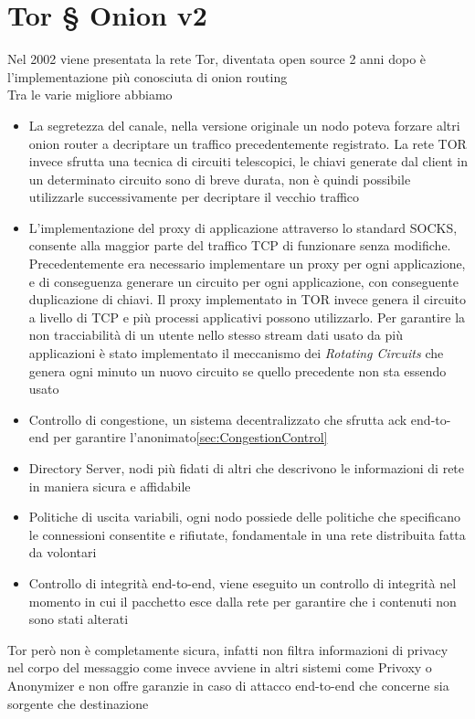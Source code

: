\newpage
\chapter{Tor § Onion v2}
\label{chap:Capitolo2}
Nel 2002 viene presentata la rete Tor, diventata open source 2 anni dopo è l'implementazione più conosciuta di onion routing \\
Tra le varie migliore abbiamo 
\begin{itemize}
    \item La segretezza del canale, nella versione originale un nodo poteva forzare altri onion router a decriptare un traffico precedentemente registrato. La rete TOR invece sfrutta una tecnica di circuiti telescopici, le chiavi generate dal client in un determinato circuito sono di breve durata, non è quindi possibile utilizzarle successivamente per decriptare il vecchio traffico
    \item L'implementazione del proxy di applicazione attraverso lo standard SOCKS, consente alla maggior parte del traffico TCP di funzionare senza modifiche. Precedentemente era necessario implementare un proxy per ogni applicazione, e di conseguenza generare un circuito per ogni applicazione, con conseguente duplicazione di chiavi. Il proxy implementato in TOR invece genera il circuito a livello di TCP e più processi applicativi possono utilizzarlo. Per garantire la non tracciabilità di un utente nello stesso stream dati usato da più applicazioni è stato implementato il meccanismo dei \emph{Rotating Circuits} che genera ogni minuto un nuovo circuito se quello precedente non sta essendo usato
    
    \item Controllo di congestione, un sistema decentralizzato che sfrutta ack end-to-end per garantire l'anonimato\ref{sec:CongestionControl}
    \item Directory Server, nodi più fidati di altri che descrivono le informazioni di rete in maniera sicura e affidabile
    \item Politiche di uscita variabili, ogni nodo possiede delle politiche che specificano le connessioni consentite e rifiutate, fondamentale in una rete distribuita fatta da volontari
    \item Controllo di integrità end-to-end, viene eseguito un controllo di integrità nel momento in cui il pacchetto esce dalla rete per garantire che i contenuti non sono stati alterati
\end{itemize}
Tor però non è completamente sicura, infatti non filtra informazioni di privacy nel corpo del messaggio come invece avviene in altri sistemi come Privoxy o Anonymizer e non offre garanzie in caso di attacco end-to-end che concerne sia sorgente che destinazione
\cite{onionv2}

